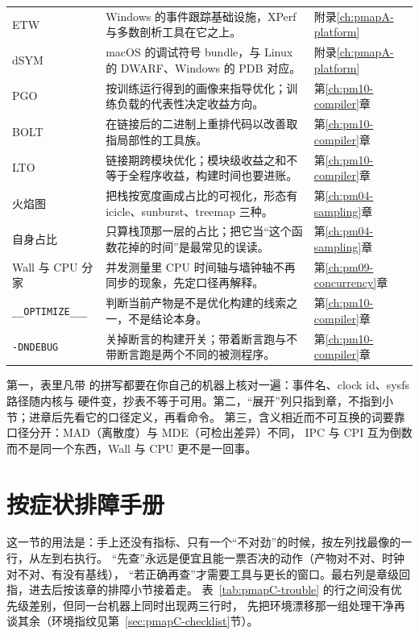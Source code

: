 \documentclass[12pt,a4paper,fontset=fandol]{ctexbook}
\newcommand{\Tp}[1]{\texttt{#1}}
\newcommand{\Bk}{\discretionary{}{}{}}
\newcommand{\Lang}[1]{\textsf{#1}}
\newcommand{\MWall}{\Lang{Wall}}
\newcommand{\MCpu}{\Lang{CPU}}
\newcommand{\Mx}[1]{\textsf{#1}}
\begin{document}
\begin{longtable}{>{\raggedright\arraybackslash}p{}
                  >{\raggedright\arraybackslash}p{}
                  >{\raggedright\arraybackslash}p{}}
ETW & Windows 的事件跟踪基础设施，XPerf 与多数剖析工具在它之上。 & 附录\ref{ch:pmapA-platform} \\
dSYM & macOS 的调试符号 bundle，与 Linux 的 DWARF、Windows 的 PDB 对应。 & 附录\ref{ch:pmapA-platform} \\
PGO & 按训练运行得到的画像来指导优化；训练负载的代表性决定收益方向。 & 第\ref{ch:pm10-compiler}章 \\
BOLT & 在链接后的二进制上重排代码以改善取指局部性的工具族。 & 第\ref{ch:pm10-compiler}章 \\
LTO & 链接期跨模块优化；模块级收益之和不等于全程序收益，构建时间也要进账。 & 第\ref{ch:pm10-compiler}章 \\
火焰图 & 把栈按宽度画成占比的可视化，形态有 \Mx{icicle}、\Mx{sunburst}、\Mx{treemap} 三种。 & 第\ref{ch:pm04-sampling}章 \\
自身占比 & 只算栈顶那一层的占比；把它当``这个函数花掉的时间''是最常见的误读。 & 第\ref{ch:pm04-sampling}章 \\
\MWall{} 与 \MCpu{} 分家 & 并发测量里 CPU 时间轴与墙钟轴不再同步的现象，先定口径再解释。 & 第\ref{ch:pm09-concurrency}章 \\
\Tp{\_\_OPTIMIZE\_{\Bk}\_\_} & 判断当前产物是不是优化构建的线索之一，不是结论本身。 & 第\ref{ch:pm10-compiler}章 \\
\Tp{-DNDEBUG} & 关掉断言的构建开关；带着断言跑与不带断言跑是两个不同的被测程序。 & 第\ref{ch:pm10-compiler}章 \\
\end{longtable}

\begin{guideline}[title={读这张表的三个规矩}]
第一，表里凡带 \Tp{} 的拼写都要在你自己的机器上核对一遍：事件名、clock id、sysfs 路径随内核与
硬件变，抄表不等于可用。第二，``展开''列只指到章，不指到小节；进章后先看它的口径定义，再看命令。
第三，含义相近而不可互换的词要靠口径分开：\Mx{MAD}（离散度）与 \Mx{MDE}（可检出差异）不同，
\Mx{IPC} 与 \Mx{CPI} 互为倒数而不是同一个东西，\MWall{} 与 \MCpu{} 更不是一回事。
\end{guideline}

\section{按症状排障手册}
\label{sec:pmapC-trouble}

这一节的用法是：手上还没有指标、只有一个``不对劲''的时候，按左列找最像的一行，从左到右执行。
``先查''永远是便宜且能一票否决的动作（产物对不对、时钟对不对、有没有基线），
``若正确再查''才需要工具与更长的窗口。最右列是章级回指，进去后按该章的排障小节接着走。
表~\ref{tab:pmapC-trouble} 的行之间没有优先级差别，但同一台机器上同时出现两三行时，
先把环境漂移那一组处理干净再谈其余（环境指纹见第~\ref{sec:pmapC-checklist}节）。
\end{document}
